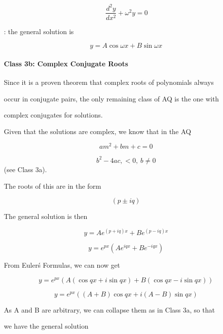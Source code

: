 $$\frac{d^2y}{dx^2}+\omega^2 y=0$$



:   the general solution is



$$y=A\cos \omega x+B\sin \omega x \,$$



\paragraph{Class 3b: Complex Conjugate Roots}



Since it is a proven theorem that complex roots of polynomials always

occur in conjugate pairs, the only remaining class of AQ is the one with

complex conjugates for solutions.



Given that the solutions are complex, we know that in the AQ



$$am^2+bm+c=0 \,$$



$$b^2-4ac,<0,\ b \ne 0 \,$$ (see Class 3a).



The roots of this are in the form



$$(p \pm iq)\,$$



The general solution is then



$$y=Ae^{(p+iq)x}+Be^{(p-iq)x}\,$$



$$y=e^{px} \left( Ae^{iqx}+Be^{-iqx}\right)\,$$



From Euler\'s Formulas, we can now get



$$y=e^{px}\left( A\left(\cos q x + i \sin q x \right)+B\left(\cos q x - i \sin q x \right) \right)\,$$



$$y=e^{px}\left( (A+B)\cos q x+i(A-B)\sin q x \right)\,$$



As A and B are arbitrary, we can collapse them as in Class 3a, so that

we have the general solution



